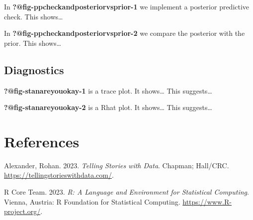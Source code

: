 \documentclass[
  letterpaper,
  DIV=11,
  numbers=noendperiod]{scrartcl}
\newlength{\cslhangindent}
\newenvironment{CSLReferences}[2] %
 {\begin{list}{}{%
  \setlength{\itemindent}{0pt}
  \setlength{\leftmargin}{0pt}
  \setlength{\parsep}{0pt}
  \ifodd #1
   \setlength{\leftmargin}{\cslhangindent}
   \setlength{\itemindent}{-1\cslhangindent}
  \fi
  \setlength{\itemsep}{#2\baselineskip}}}
 {\end{list}}
\begin{document}
In \textbf{?@fig-ppcheckandposteriorvsprior-1} we implement a posterior
predictive check. This shows\ldots{}

In \textbf{?@fig-ppcheckandposteriorvsprior-2} we compare the posterior
with the prior. This shows\ldots{}

\subsection{Diagnostics}\label{diagnostics}

\textbf{?@fig-stanareyouokay-1} is a trace plot. It shows\ldots{} This
suggests\ldots{}

\textbf{?@fig-stanareyouokay-2} is a Rhat plot. It shows\ldots{} This
suggests\ldots{}

\newpage

\section*{References}\label{references}

\label{refs}
\begin{CSLReferences}{1}{0}
Alexander, Rohan. 2023. \emph{Telling Stories with Data}. Chapman;
Hall/CRC. \url{https://tellingstorieswithdata.com/}.

R Core Team. 2023. \emph{{R: A Language and Environment for Statistical
Computing}}. Vienna, Austria: R Foundation for Statistical Computing.
\url{https://www.R-project.org/}.

\end{CSLReferences}
\end{document}
